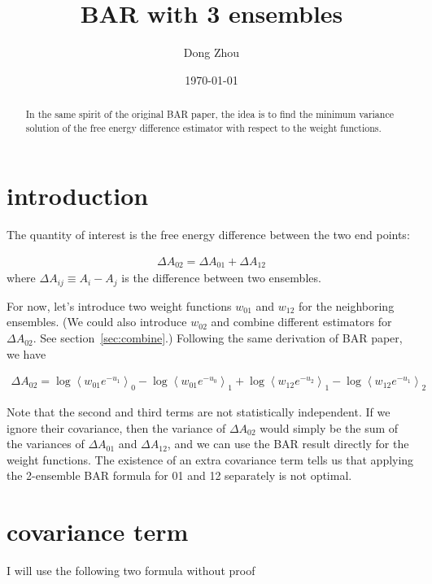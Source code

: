 \documentclass[notitlepage, amsmath, amssymb, aps]{revtex4-1}
\begin{document}
\title{BAR with 3 ensembles}

\author{Dong Zhou}
\date{\today}

\begin{abstract}
In the same spirit of the original BAR paper, the idea is to find the minimum variance solution
of the free energy difference estimator with respect to the weight functions.
\end{abstract}

\maketitle

\section{introduction}

The quantity of interest is the free energy difference between the two end points:

\begin{align}
\Delta A_{02} = \Delta A_{01} + \Delta A_{12}
\end{align}
where $\Delta A_{ij} \equiv A_i - A_j$ is the difference between two ensembles.

For now, let's introduce two weight functions $w_{01}$ and $w_{12}$ for the neighboring ensembles.
(We could also introduce $w_{02}$ and combine different estimators for $\Delta A_{02}$. See section~\ref{sec:combine}.)
Following the same derivation of BAR paper, we have

\begin{align}
\Delta A_{02} = \log\left<w_{01} e^{-u_1}\right>_0 - \log\left<w_{01}e^{-u_0}\right>_1
              + \log\left<w_{12} e^{-u_2}\right>_1 - \log\left<w_{12}e^{-u_1}\right>_2
\end{align}

Note that the second and third terms are not statistically independent.
If we ignore their covariance, then the variance of $\Delta A_{02}$ would simply be the sum of
the variances of $\Delta A_{01}$ and $\Delta A_{12}$, and we can use the BAR result directly for the weight functions.
The existence of an extra covariance term tells us that applying the 2-ensemble BAR formula for 01 and 12 separately is not optimal.

\section{covariance term}
I will use the following two formula without proof
\end{document}
